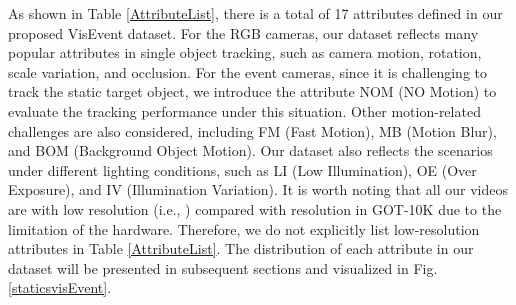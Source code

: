 \documentclass[journal]{IEEEtran}
\begin{document}
As shown in Table \ref{AttributeList}, there is a total of 17 attributes defined in our proposed VisEvent dataset. For the RGB cameras, our dataset reflects many popular attributes in single object tracking, such as camera motion, rotation, scale variation, and occlusion. For the event cameras, since it is challenging to track the static target object, we introduce the attribute NOM (NO Motion) to evaluate the tracking performance under this situation. Other motion-related challenges are also considered, including FM (Fast Motion), MB (Motion Blur), and BOM (Background Object Motion). Our dataset also reflects the scenarios under different lighting conditions, such as LI (Low Illumination), OE (Over Exposure), and IV (Illumination Variation). It is worth noting that all our videos are with low resolution (i.e., ) compared with resolution  in GOT-10K \cite{huang2019got10k} due to the limitation of the hardware. Therefore, we do not explicitly list low-resolution attributes in Table \ref{AttributeList}. The distribution of each attribute in our dataset will be presented in subsequent sections and visualized in Fig. \ref{staticsvisEvent}. 
\end{document}
